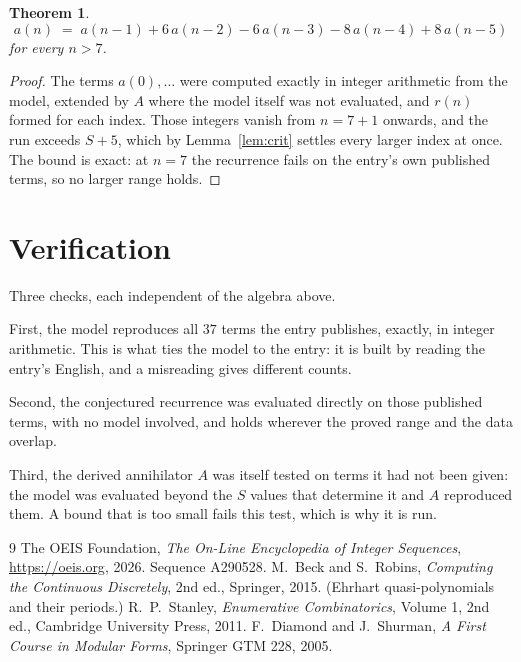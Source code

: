 \documentclass[11pt,a4paper]{article}
\theoremstyle{plain}
\newtheorem{theorem}{Theorem}
\theoremstyle{definition}
\begin{document}
\begin{theorem}
\[
a(n)\;=\;a(n-1) + 6\,a(n-2) - 6\,a(n-3) - 8\,a(n-4) + 8\,a(n-5)
\]
for every $n>7$.
\end{theorem}

\begin{proof}
The terms $a(0),\dots$ were computed exactly in integer arithmetic from the model, extended by
$A$ where the model itself was not evaluated, and $r(n)$ formed for each index. Those integers
vanish from $n=7+1$ onwards, and the run exceeds $S+5$, which by
Lemma~\ref{lem:crit} settles every larger index at once. The bound is exact: at $n=7$ the recurrence fails on the entry's own published terms, so no larger range holds.
\end{proof}

\section{Verification}

Three checks, each independent of the algebra above.

First, the model reproduces all $37$ terms the entry publishes, exactly, in integer
arithmetic. This is what ties the model to the entry: it is built by reading the entry's
English, and a misreading gives different counts.

Second, the conjectured recurrence was evaluated directly on those published terms, with no
model involved, and holds wherever the proved range and the data overlap.

Third, the derived annihilator $A$ was itself tested on terms it had not been given: the model
was evaluated beyond the $S$ values that determine it and $A$ reproduced them. A bound that is
too small fails this test, which is why it is run.

\begin{thebibliography}{9}
 The OEIS Foundation, \emph{The On-Line Encyclopedia of Integer
Sequences}, \url{https://oeis.org}, 2026. Sequence A290528.
 M.~Beck and S.~Robins, \emph{Computing the Continuous Discretely},
2nd ed., Springer, 2015. (Ehrhart quasi-polynomials and their periods.)
 R.~P.~Stanley, \emph{Enumerative Combinatorics}, Volume 1, 2nd ed.,
Cambridge University Press, 2011.
 F.~Diamond and J.~Shurman, \emph{A First Course in Modular Forms},
Springer GTM 228, 2005.
\end{thebibliography}
\end{document}
